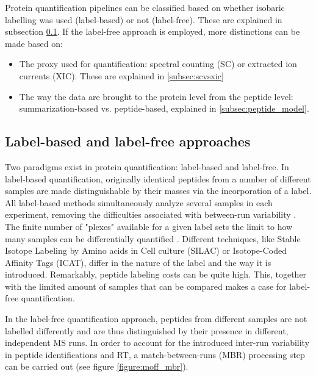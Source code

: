 \documentclass[11pt, a4paper]{report}
\begin{document}
Protein quantification pipelines can be classified based on whether isobaric labelling was used (label-based) or not (label-free). These are explained in subsection \ref{subsec:labelling}. If the label-free approach is employed, more distinctions can be made based on:

\begin{itemize}
\item The proxy used for quantification: spectral counting (\ac{SC}) or extracted ion currents (\ac{XIC}). These are explained in \ref{subsec:scvsxic}


\item The way the data are brought to the protein level from the peptide level: summarization-based vs. peptide-based, explained in \ref{subsec:peptide_model}.
\end{itemize}

\subsection{Label-based and label-free approaches}
\label{subsec:labelling}


Two paradigms exist in protein quantification: label-based and label-free. In label-based quantification, originally identical peptides from a number of different samples are made distinguishable by their masses via the incorporation of a label. All label-based methods simultaneously analyze several samples in each experiment, removing the difficulties associated with between-run variability \cite{Barsnes2008}. The finite number of "plexes" available for a given label sets the limit to how many samples can be differentially quantified \cite{Cox2014}. Different techniques, like Stable Isotope Labeling by Amino acids in Cell culture (SILAC) or Isotope-Coded Affinity Tags (ICAT), differ in the nature of the label and the way it is introduced. Remarkably, peptide labeling costs can be quite high. This, together with the limited amount of samples that can be compared makes a case for label-free quantification.

In the label-free quantification approach, peptides from different samples are not labelled differently and are thus distinguished by their presence in different, independent \ac{MS} runs. In order to account for the introduced inter-run variability in peptide identifications and \ac{RT}, a match-between-runs (MBR) processing step can be carried out (see figure \ref{figure:moff_mbr}). 
\end{document}
